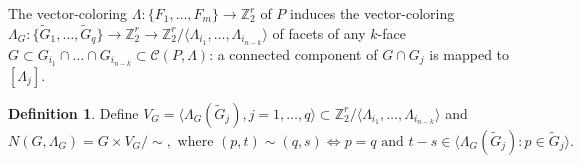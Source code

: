 \documentclass[12pt]{amsart}
\theoremstyle{definition}
\newtheorem{definition}[formula]{Definition}
\theoremstyle{remark}
\begin{document}
The vector-coloring $\Lambda\colon\{F_1,\dots, F_m\}\to\mathbb Z_2^r$ 
of $P$ induces the vector-coloring $\Lambda_G\colon\{\widetilde{G}_1,\dots,\widetilde{G}_q\}\to \mathbb Z_2^r\to
\mathbb Z_2^r/\langle \Lambda_{i_1},\dots,\Lambda_{i_{n-k}}\rangle$ of facets of any $k$-face 
$G\subset G_{i_1}\cap\dots\cap G_{i_{n-k}}\subset \mathcal{C}(P,\Lambda)$: a connected component of
$G\cap G_j$ is mapped to $[\Lambda_j]$. 
\begin{definition}
Define $V_G=\langle \Lambda_G(\widetilde{G}_j),j=1,\dots,q\rangle\subset \mathbb Z_2^r/\langle \Lambda_{i_1},\dots,\Lambda_{i_{n-k}}\rangle $ and
$$
N(G,\Lambda_G)=G\times V_G/\sim,\text{ where }(p,t)\sim (q,s)\Leftrightarrow p=q\text{ and }t-s\in 
\langle\Lambda_G(\widetilde{G}_j)\colon p\in \widetilde{G}_j\rangle.
$$
\end{definition}
\end{document}
